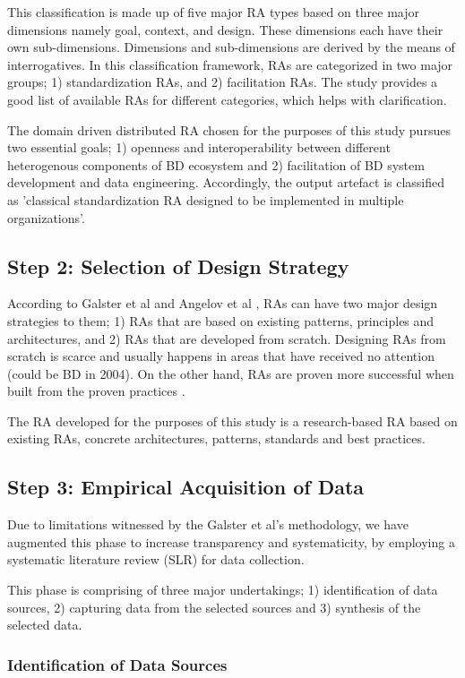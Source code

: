 \documentclass[runningheads]{llncs}
\begin{document}
This classification is made up of five major RA types based on three major dimensions namely goal, context, and design. These dimensions each have their own sub-dimensions. Dimensions and sub-dimensions are derived by the means of interrogatives. In this classification framework, RAs are categorized in two major groups; 1) standardization RAs, and 2) facilitation RAs. The study provides a good list of available RAs for different categories, which helps with clarification. 

The domain driven distributed RA chosen for the purposes of this study pursues two essential goals; 1) openness and interoperability between different heterogenous components of BD ecosystem and 2) facilitation of BD system development and data engineering. Accordingly, the output artefact is classified as 'classical standardization RA designed to be implemented in multiple organizations'. 

\subsection{Step 2: Selection of Design Strategy}
According to Galster et al \cite{GALSTER} and Angelov et al \cite{angelov2008towards}, RAs can have two major design strategies to them; 1) RAs that are based on existing patterns, principles and architectures, and 2) RAs that are developed from scratch. Designing RAs from scratch is scarce and usually happens in areas that have received no attention (could be BD in 2004). On the other hand, RAs are proven more successful when built from the proven practices \cite{Cloutier}. 

The RA developed for the purposes of this study is a research-based RA based on existing RAs, concrete architectures, patterns, standards and best practices.

\subsection*{Step 3: Empirical Acquisition of Data}
Due to limitations witnessed by the Galster et al's methodology, we have augmented this phase to increase transparency and systematicity, by employing a systematic literature review (SLR) for data collection. 

This phase is comprising of three major undertakings; 1) identification of data sources, 2) capturing data from the selected sources and 3) synthesis of the selected data. 

\subsubsection{Identification of Data Sources}
\end{document}
